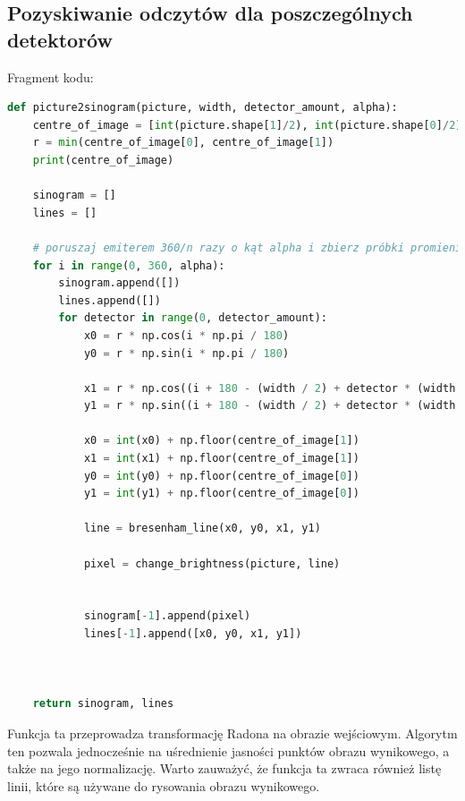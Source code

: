 \documentclass[11pt,a4paper]{article}
\begin{document}
    \subsection{Pozyskiwanie odczytów dla poszczególnych detektorów}
    Fragment kodu:
\begin{lstlisting}[language=Python, basicstyle=\normal, breaklines=true]
def picture2sinogram(picture, width, detector_amount, alpha):
    centre_of_image = [int(picture.shape[1]/2), int(picture.shape[0]/2)]
    r = min(centre_of_image[0], centre_of_image[1])
    print(centre_of_image)

    sinogram = []
    lines = []

    # poruszaj emiterem 360/n razy o kąt alpha i zbierz próbki promieni.
    for i in range(0, 360, alpha):
        sinogram.append([])
        lines.append([])
        for detector in range(0, detector_amount):
            x0 = r * np.cos(i * np.pi / 180)
            y0 = r * np.sin(i * np.pi / 180)

            x1 = r * np.cos((i + 180 - (width / 2) + detector * (width / (detector_amount - 1))) * np.pi / 180)
            y1 = r * np.sin((i + 180 - (width / 2) + detector * (width / (detector_amount - 1))) * np.pi / 180)

            x0 = int(x0) + np.floor(centre_of_image[1])
            x1 = int(x1) + np.floor(centre_of_image[1])
            y0 = int(y0) + np.floor(centre_of_image[0])
            y1 = int(y1) + np.floor(centre_of_image[0])

            line = bresenham_line(x0, y0, x1, y1)

            pixel = change_brightness(picture, line)


            sinogram[-1].append(pixel)
            lines[-1].append([x0, y0, x1, y1])



    return sinogram, lines
    \end{lstlisting}
    Funkcja ta przeprowadza transformację Radona na obrazie wejściowym.
    Algorytm ten pozwala jednocześnie na uśrednienie jasności punktów obrazu wynikowego, a także na jego normalizację.
    Warto zauważyć, że funkcja ta zwraca również listę linii, które są używane do rysowania obrazu wynikowego.
\end{document}
